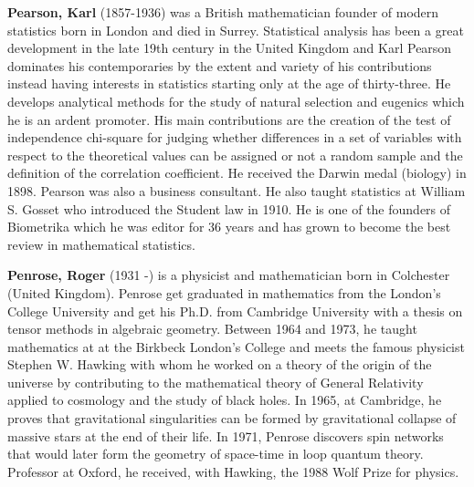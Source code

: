 \textbf{Pearson, Karl} (1857-1936) was a British mathematician founder of modern statistics born in London and died in Surrey. Statistical analysis has been a great development in the late 19th century in the United Kingdom and Karl Pearson dominates his contemporaries by the extent and variety of his contributions instead having interests in statistics starting only at the age of thirty-three. He develops analytical methods for the study of natural selection and eugenics which he is an ardent promoter. His main contributions are the creation of the test of independence chi-square for judging whether differences in a set of variables with respect to the theoretical values can be assigned or not a random sample and the definition of the correlation coefficient. He received the Darwin medal (biology) in 1898. Pearson was also a business consultant. He also taught statistics at William S. Gosset who introduced the Student law in 1910. He is one of the founders of Biometrika which he was editor for 36 years and has grown to become the best review in mathematical statistics.

\textbf{Penrose, Roger }(1931 -) is a physicist and mathematician born in Colchester (United Kingdom). Penrose get graduated in mathematics from the London's College University and get his Ph.D. from Cambridge University with a thesis on tensor methods in algebraic geometry. Between 1964 and 1973, he taught mathematics at at the Birkbeck London's College and meets the famous physicist Stephen W. Hawking with whom he worked on a theory of the origin of the universe by contributing to the mathematical theory of General Relativity applied to cosmology and the study of black holes. In 1965, at Cambridge, he proves that gravitational singularities can be formed by gravitational collapse of massive stars at the end of their life. In 1971, Penrose discovers spin networks that would later form the geometry of space-time in loop quantum theory. Professor at Oxford, he received, with Hawking, the 1988 Wolf Prize for physics.

